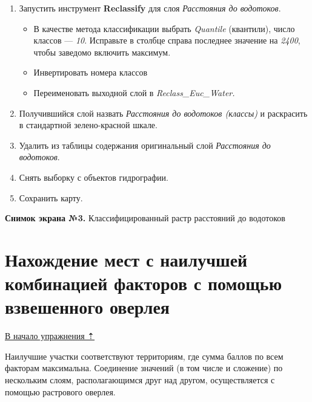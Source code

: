 \documentclass[]{book}
\theoremstyle{definition}
\theoremstyle{definition}
\theoremstyle{definition}
\theoremstyle{remark}
\begin{document}
\begin{enumerate}
\def\labelenumi{\arabic{enumi}.}
\item
  Запустить инструмент \textbf{Reclassify} для слоя \emph{Расстояния до
  водотоков}.

  \begin{itemize}
  \item
    В качестве метода классификации выбрать \emph{Quantile} (квантили),
    число классов --- \emph{10}. Исправьте в столбце справа последнее
    значение на \emph{2400}, чтобы заведомо включить максимум.
  \item
    Инвертировать номера классов
  \item
    Переименовать выходной слой в \emph{Reclass\_Euc\_Water.}
  \end{itemize}
\item
  Получившийся слой назвать \emph{Расстояния до водотоков (классы)} и
  раскрасить в стандартной зелено-красной шкале.
\item
  Удалить из таблицы содержания оригинальный слой \emph{Расстояния до
  водотоков}.
\item
  Снять выборку с объектов гидрографии.
\item
  Сохранить карту.
\end{enumerate}

\textbf{Снимок экрана №3.} Классифицированный растр расстояний до
водотоков

\hypertarget{weighted-overlay-combination}{%
\section{Нахождение мест с наилучшей комбинацией факторов с помощью
взвешенного оверлея}\label{weighted-overlay-combination}}

\protect\hyperlink{weighted-overlay}{В начало упражнения ⇡}

Наилучшие участки соответствуют территориям, где сумма баллов по всем
факторам максимальна. Соединение значений (в том числе и сложение) по
нескольким слоям, располагающимся друг над другом, осуществляется с
помощью растрового оверлея.
\end{document}
